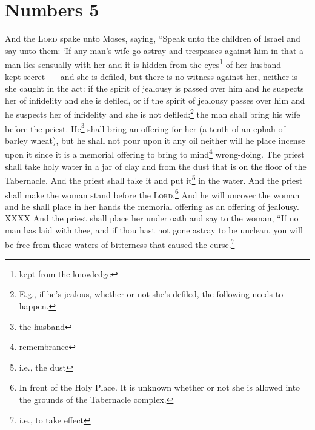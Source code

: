 \section{Numbers 5}\label{Numbers 5}
\begin{enumerate}
     And the \textsc{Lord} spake unto Moses, saying,%
     ``Speak unto the children of Israel and say unto them: `If any man's wife go astray and trespasses against him%
     in that a man lies sensually with her and it is hidden from the eyes\footnote{kept from the knowledge} of her husband~--- kept secret~--- and she is defiled, but there is no witness against her, neither is she caught in the act:%
     if the spirit of jealousy is passed over him and he suspects her of infidelity and she is defiled, or if the spirit of jealousy passes over him and he suspects her of infidelity and she is not defiled:\footnote{E.g., if he's jealous, whether or not she's defiled, the following needs to happen.}%
     the man shall bring his wife before the priest. He\footnote{the husband} shall bring an offering for her (a tenth of an ephah of barley wheat), but he shall not pour upon it any oil neither will he place incense upon it since it is a memorial offering to bring to mind\footnote{remembrance} wrong-doing.%
     The priest shall take holy water in a jar of clay and from the dust that is on the floor of the Tabernacle. And the priest shall take it and put it\footnote{i.e., the dust} in the water.%
     And the priest shall make the woman stand before the \textsc{Lord}.\footnote{In front of the Holy Place. It is unknown whether or not she is allowed into the grounds of the Tabernacle complex.} And he will uncover the woman and he shall place in her hands the memorial offering as an offering of jealousy. XXXX%
     And the priest shall place her under oath and say to the woman, ``If no man has laid with thee, and if thou hast not gone astray to be unclean, you will be free from these waters of bitterness that caused the curse.\footnote{i.e., to take effect}%

\end{enumerate}
